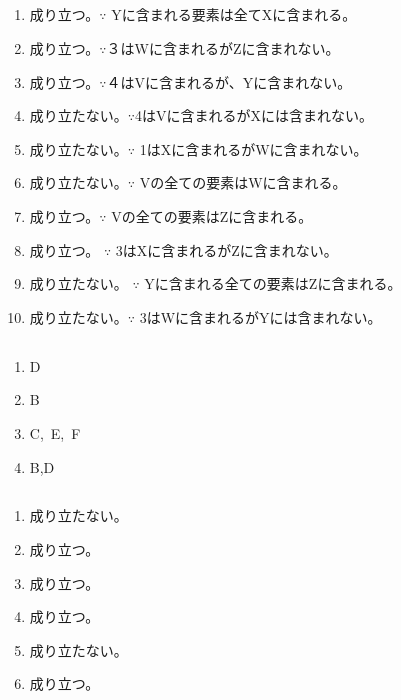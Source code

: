 \documentclass{jsarticle}
\begin{document}
\subsection{}
\begin{enumerate}
\item 成り立つ。$\because$ Yに含まれる要素は全てXに含まれる。
\item 成り立つ。$\because$３はWに含まれるがZに含まれない。
\item 成り立つ。$\because$４はVに含まれるが、Yに含まれない。
\item 成り立たない。$\because$4はVに含まれるがXには含まれない。
\item 成り立たない。$\because$ 1はXに含まれるがWに含まれない。
\item 成り立たない。$\because$ Vの全ての要素はWに含まれる。
\item 成り立つ。$\because$ Vの全ての要素はZに含まれる。
\item 成り立つ。 $\because$ 3はXに含まれるがZに含まれない。
\item 成り立たない。 $\because$ Yに含まれる全ての要素はZに含まれる。
\item 成り立たない。$\because$ 3はWに含まれるがYには含まれない。
\end{enumerate}

\subsection{}
\begin{enumerate}
\item D
\item B
\item C,\ E,\ F
\item B,D
\end{enumerate}

\subsection{}
\begin{enumerate}
\item 成り立たない。
\item 成り立つ。
\item 成り立つ。
\item 成り立つ。
\item 成り立たない。
\item 成り立つ。
\end{enumerate}

\end{document}
